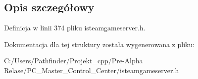 \subsection{Opis szczegółowy}


Definicja w linii 374 pliku isteamgameserver.\+h.



Dokumentacja dla tej struktury została wygenerowana z pliku\+:\begin{DoxyCompactItemize}
\item 
C\+:/\+Users/\+Pathfinder/\+Projekt\+\_\+cpp/\+Pre-\/\+Alpha Relase/\+P\+C\+\_\+\+Master\+\_\+\+Control\+\_\+\+Center/isteamgameserver.\+h\end{DoxyCompactItemize}
